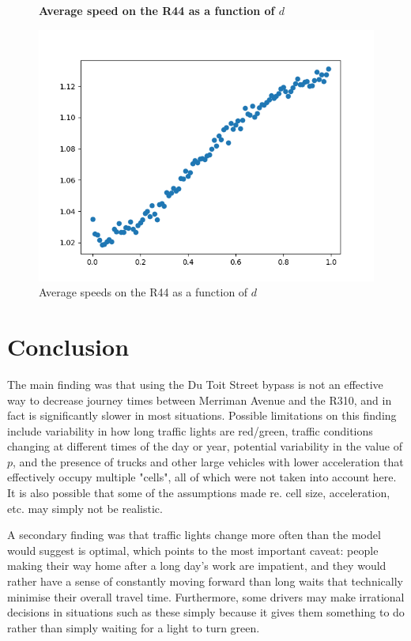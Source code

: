 \documentclass{article}
\begin{document}
\begin{figure}
\textbf{\large Average speed on the R44 as a function of $d$}\par\medskip
{}
\includegraphics[scale = 0.55, left]{./data/phase4/v_vs_d.png}
\vspace*{0.1cm}\hspace*{4.5cm}{\large $d$}
\caption{\label{fig} Average speeds on the R44 as a function of $d$}
\end{figure}

\section*{Conclusion}

The main finding was that using the Du Toit Street bypass is not an effective way to decrease journey times between Merriman Avenue and the R310, and in fact is significantly slower in most situations. Possible limitations on this finding include variability in how long traffic lights are red/green, traffic conditions changing at different times of the day or year, potential variability in the value of $p$, and the presence of trucks and other large vehicles with lower acceleration that effectively occupy multiple "cells", all of which were not taken into account here. It is also possible that some of the assumptions made re. cell size, acceleration, etc. may simply not be realistic.

A secondary finding was that traffic lights change more often than the model would suggest is optimal, which points to the most important caveat: people making their way home after a long day's work are impatient, and they would rather have a sense of constantly moving forward than long waits that technically minimise their overall travel time. Furthermore, some drivers may make irrational decisions in situations such as these simply because it gives them something to do rather than simply waiting for a light to turn green.
\end{document}
